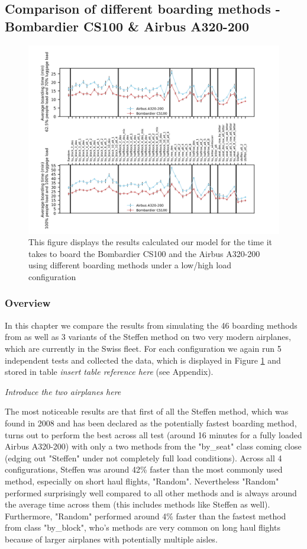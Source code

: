 \documentclass[11pt]{article}
\begin{document}
\subsection{Comparison of different boarding methods - Bombardier CS100 \& Airbus A320-200}
\begin{figure}
	\includegraphics[width=\linewidth]{../../code/AirplaneBoarding/data/figure2/figure2.png}
	\caption{This figure displays the results calculated our model for the time it takes to board the Bombardier CS100 and the Airbus A320-200 using different boarding methods under a low/high load configuration}
	\label{figure2}
\end{figure}

 
 \subsubsection{Overview}
 In this chapter we compare the results from simulating the 46 boarding methods from \cite{beus} as well as 3 variants of the Steffen method \cite{steffen} on two very modern airplanes, which are currently in the Swiss fleet. For each configuration we again run 5 independent tests and collected the data, which is displayed in Figure \ref{figure2} and stored in table \textit{insert table reference here} (see Appendix). 
 
 \textit{Introduce the two airplanes here}
 
 The most noticeable results are that first of all the Steffen method, which was found in 2008 and has been declared as the potentially fastest boarding method, turns out to perform the best across all test (around 16 minutes for a fully loaded Airbus A320-200) with only a two methods from the "by\_seat" class coming close (edging out "Steffen" under not completely full load conditions). Across all 4 configurations, Steffen was around 42\% faster than the most commonly used method, especially on short haul flights, "Random". Nevertheless "Random" performed surprisingly well compared to all other methods and is always around the average time across them (this includes methods like Steffen as well). Furthermore, "Random" performed around 4\% faster than the fastest method from class "by\_block", who's methods are very common on long haul flights because of larger airplanes with potentially multiple aisles.
 
\end{document}
